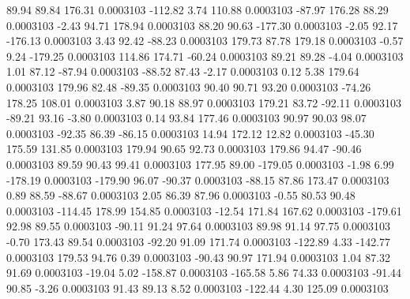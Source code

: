       89.94       89.84      176.31     0.0003103
     -112.82        3.74      110.88     0.0003103
      -87.97      176.28       88.29     0.0003103
       -2.43       94.71      178.94     0.0003103
       88.20       90.63     -177.30     0.0003103
       -2.05       92.17     -176.13     0.0003103
        3.43       92.42      -88.23     0.0003103
      179.73       87.78      179.18     0.0003103
       -0.57        9.24     -179.25     0.0003103
      114.86      174.71      -60.24     0.0003103
       89.21       89.28       -4.04     0.0003103
        1.01       87.12      -87.94     0.0003103
      -88.52       87.43       -2.17     0.0003103
        0.12        5.38      179.64     0.0003103
      179.96       82.48      -89.35     0.0003103
       90.40       90.71       93.20     0.0003103
      -74.26      178.25      108.01     0.0003103
        3.87       90.18       88.97     0.0003103
      179.21       83.72      -92.11     0.0003103
      -89.21       93.16       -3.80     0.0003103
        0.14       93.84      177.46     0.0003103
       90.97       90.03       98.07     0.0003103
      -92.35       86.39      -86.15     0.0003103
       14.94      172.12       12.82     0.0003103
      -45.30      175.59      131.85     0.0003103
      179.94       90.65       92.73     0.0003103
      179.86       94.47      -90.46     0.0003103
       89.59       90.43       99.41     0.0003103
      177.95       89.00     -179.05     0.0003103
       -1.98        6.99     -178.19     0.0003103
     -179.90       96.07      -90.37     0.0003103
      -88.15       87.86      173.47     0.0003103
        0.89       88.59      -88.67     0.0003103
        2.05       86.39       87.96     0.0003103
       -0.55       80.53       90.48     0.0003103
     -114.45      178.99      154.85     0.0003103
      -12.54      171.84      167.62     0.0003103
     -179.61       92.98       89.55     0.0003103
      -90.11       91.24       97.64     0.0003103
       89.98       91.14       97.75     0.0003103
       -0.70      173.43       89.54     0.0003103
      -92.20       91.09      171.74     0.0003103
     -122.89        4.33     -142.77     0.0003103
      179.53       94.76        0.39     0.0003103
      -90.43       90.97      171.94     0.0003103
        1.04       87.32       91.69     0.0003103
      -19.04        5.02     -158.87     0.0003103
     -165.58        5.86       74.33     0.0003103
      -91.44       90.85       -3.26     0.0003103
       91.43       89.13        8.52     0.0003103
     -122.44        4.30      125.09     0.0003103
